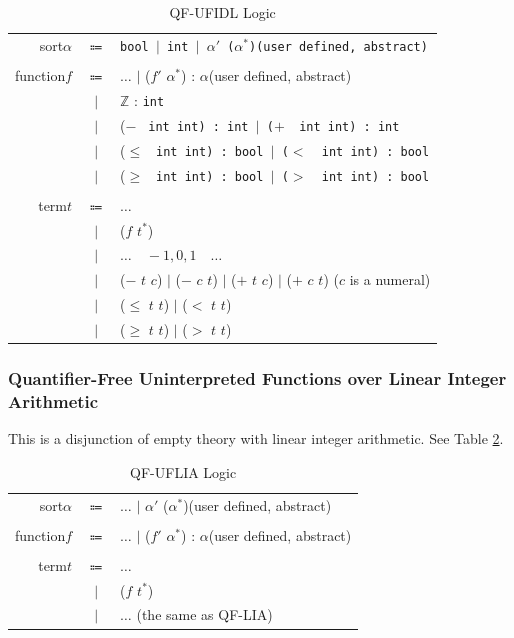 \documentclass[10pt,letter]{article}
\theoremstyle{definition}
\begin{document}
\begin{table}[!h]
\begin{mdframed}
\centering
\begin{tabular}{r c l}
sort\qquad $\alpha$ & $\Coloneqq$ & \tt bool $\mid$ int $\mid$ $\alpha'$ \rm($\alpha^*$)\qquad(user defined, abstract)\\
\\
function\qquad $f$ & $\Coloneqq$ & $\ldots$ $\mid$ \rm ($f'$ $\alpha^*$) : $\alpha$\qquad(user defined, abstract)\\
& $\mid$ & $\mathbb{Z}$ \rm : \tt int\\
& $\mid$ & ($-$ \tt\ int int\rm) : \tt int $\mid$ \rm($+$ \tt\ int int\rm) : \tt int\\
& $\mid$ & ($\leqslant$ \tt\ int int\rm) : \tt bool $\mid$ \rm($<$ \tt\ int int\rm) : \tt bool\\
& $\mid$ & ($\geqslant$ \tt\ int int\rm) : \tt bool $\mid$ \rm($>$ \tt\ int int\rm) : \tt bool\\
\\
term\qquad $t$ & $\Coloneqq$ & $\ldots$ \\
& $\mid$ & ($f$ $t^*$)\\
& $\mid$ & $\ldots\quad-1,0,1\quad\ldots$\\
& $\mid$ & ($-$ $t$ $c$) $\mid$ ($-$ $c$ $t$) $\mid$ ($+$ $t$ $c$) $\mid$ ($+$ $c$ $t$) \qquad($c$ is a numeral)\\
& $\mid$ & ($\leqslant$ $t$ $t$) $\mid$ ($<$ $t$ $t$)\\
& $\mid$ & ($\geqslant$ $t$ $t$) $\mid$ ($>$ $t$ $t$)\\
\end{tabular}
\end{mdframed}
\caption{QF-UFIDL Logic}
\label{t:qfufidl}
\end{table}

\subsubsection{Quantifier-Free Uninterpreted Functions over Linear Integer Arithmetic}
This is a disjunction of empty theory with linear integer arithmetic. See Table \ref{t:qfuflia}.

\begin{table}[!h]
\begin{mdframed}
\centering
\begin{tabular}{r c l}
sort\qquad $\alpha$ & $\Coloneqq$ & $\ldots$ $\mid$ $\alpha'$ ($\alpha^*$)\rm\qquad(user defined, abstract)\\
\\
function\qquad $f$ & $\Coloneqq$ & $\ldots$ $\mid$ \rm ($f'$ $\alpha^*$) : $\alpha$\qquad(user defined, abstract)\\
\\
term\qquad $t$ & $\Coloneqq$ & $\ldots$ \\
& $\mid$ & ($f$ $t^*$)\\
& $\mid$ & $\ldots$ \qquad(\rm the same as QF-LIA)\\
\end{tabular}
\end{mdframed}
\caption{QF-UFLIA Logic}
\label{t:qfuflia}
\end{table}
\end{document}
